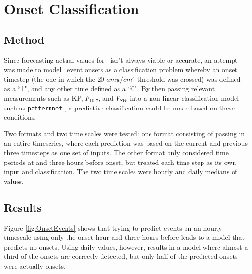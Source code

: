 \chapter[Onset Classification]{Onset Classification}

\section{Method}
Since forecasting actual values for \req\ isn't always viable or accurate, an attempt was made to model \req\ event onsets as a classification problem whereby an onset timestep (the one in which the 20 $amu/cm^3$ threshold was crossed) was defined as a ``1", and any other time defined as a ``0". By then passing relevant measurements such as KP, $F_{10.7}$, and $V_{SW}$ into a non-linear classification model such as \texttt{patternnet} \citep{MATLAB:2014}, a predictive classification could be made based on these conditions.

Two formats and two time scales were tested: one format consisting of passing in an entire timeseries, where each prediction was based on the current and previous three timesteps as one set of inputs. The other format only considered time periods at and three hours before onset, but treated each time step as its own input and classification. The two time scales were hourly and daily medians of values.


\section{Results}

Figure \ref{fig:OnsetEvents} shows that trying to predict events on an hourly timescale using only the onset hour and three hours before leads to a model that predicts no onsets. Using daily values, however, results in a model where almost a third of the onsets are correctly detected, but only half of the predicted onsets were actually onsets.

